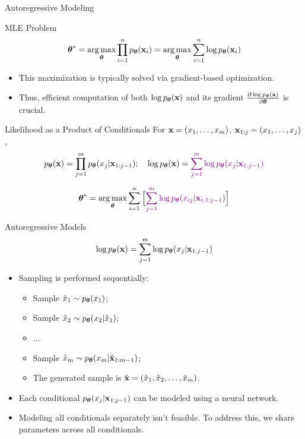 \documentclass{beamer}
\begin{document}
\begin{frame}{Autoregressive Modeling}
    \begin{block}{MLE Problem}
	    \vspace{-0.4cm}
	    $$
	        \boldsymbol{\theta}^* = \operatorname*{arg\,max}_{\boldsymbol{\theta}} \prod_{i=1}^n p_{\boldsymbol{\theta}}(\mathbf{x}_i) = \operatorname*{arg\,max}_{\boldsymbol{\theta}} \sum_{i=1}^n \log p_{\boldsymbol{\theta}}(\mathbf{x}_i)
	    $$
	    \vspace{-0.5cm}
    \end{block}
    \eqpause
    \begin{itemize}
        \item This maximization is typically solved via gradient-based optimization.
        \item Thus, efficient computation of both $\log p_{\boldsymbol{\theta}}(\mathbf{x})$ and its gradient $\frac{\partial \log p_{\boldsymbol{\theta}}(\mathbf{x})}{\partial \boldsymbol{\theta}}$ is crucial.
    \end{itemize}
    \eqpause
    \begin{block}{Likelihood as a Product of Conditionals}
    For $\mathbf{x} = (x_1, \dots, x_m)$, $\mathbf{x}_{1:j} = (x_1, \dots, x_j)$,
    $$
        p_{\boldsymbol{\theta}}(\mathbf{x}) = \prod_{j=1}^m p_{\boldsymbol{\theta}}(x_j | \mathbf{x}_{1:j - 1});\quad
        \log p_{\boldsymbol{\theta}}(\mathbf{x}) = {\color{violet}\sum_{j=1}^m \log p_{\boldsymbol{\theta}}(x_j | \mathbf{x}_{1:j - 1})}
    $$
    \end{block}
    \eqpause
    \vspace{-0.5cm}
	 $$
	     \boldsymbol{\theta}^* =  \operatorname*{arg\,max}_{\boldsymbol{\theta}} \sum_{i=1}^n \Big[{\color{violet} \sum_{j=1}^m \log p_{\boldsymbol{\theta}}(x_{ij} | \mathbf{x}_{i, 1:j - 1})}\Big]
	 $$
\end{frame}
\begin{frame}{Autoregressive Models}
    \[
    	\log p_{\boldsymbol{\theta}}(\mathbf{x}) = \sum_{j=1}^m \log p_{\boldsymbol{\theta}}(x_j | \mathbf{x}_{1:j - 1})
    \]
    \eqpause
    \begin{itemize}
	    \item Sampling is performed sequentially:
	    \begin{itemize}
    		\item Sample $\hat{x}_1 \sim p_{\boldsymbol{\theta}}(x_1)$;
    		\item Sample $\hat{x}_2 \sim p_{\boldsymbol{\theta}}(x_2 | \hat{x}_1)$;
    		\item $\ldots$
    		\item Sample $\hat{x}_m \sim p_{\boldsymbol{\theta}}(x_m | \hat{\mathbf{x}}_{1:m-1})$;
    		\item The generated sample is $\hat{\mathbf{x}} = (\hat{x}_1, \hat{x}_2, \ldots, \hat{x}_m)$.
    	\end{itemize}
        \eqpause
        \item Each conditional $p_{\boldsymbol{\theta}}(x_j | \mathbf{x}_{1:j - 1})$ can be modeled using a neural network.
        \eqpause
        \item Modeling all conditionals separately isn't feasible. To address this, we share parameters across all conditionals.
    \end{itemize}
\end{frame}
\end{document}
